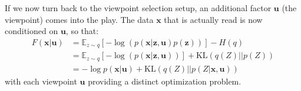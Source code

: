 \documentclass[12pt,twoside,openright]{article}
\begin{document}
If we now turn back to the viewpoint selection setup, an additional factor $\boldsymbol{u}$ (the viewpoint) comes into the play. The data $\boldsymbol{x}$ that is actually read is now conditioned on  $\boldsymbol{u}$, so that:
\begin{align}
F(\boldsymbol{x}|\boldsymbol{u}) 
&= \mathbb{E}_{z\sim q} \left[-\log (p(\boldsymbol{x}|\boldsymbol{z},\boldsymbol{u})p(\boldsymbol{z}))\right] - H(q)\\
&= \mathbb{E}_{z\sim q} \left[-\log (p(\boldsymbol{x}|\boldsymbol{z},\boldsymbol{u}))\right] +\text{KL}(q(Z)||p(Z))
\label{eq:FEP-prior-u}\\
&= - \log p(\boldsymbol{x}|\boldsymbol{u}) + \text{KL}(q(Z)||p(Z|\boldsymbol{x}, \boldsymbol{u}))
\label{eq:FEP-posterior-u}\end{align}
with each viewpoint $\boldsymbol{u}$ providing a distinct optimization problem. 
 
\end{document}
